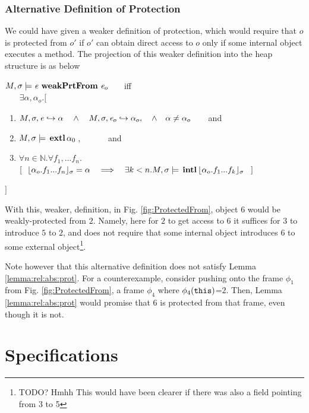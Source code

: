 \subsubsection{Alternative Definition of Protection}

We could have given a weaker definition of protection, which would require that $o$ is protected from $o'$ if $o'$ can obtain direct access to $o$ only if some internal object executes a method. 
The projection of this weaker definition into the heap structure is as below


$\satisfiesA{M}{\sigma}{ {\re\ }\textbf{weakPrtFrom}\ {\re_o} }$  \ \ \ iff \\
$\strut \ \ \ \ $  $\exists \alpha, \alpha_{o}. [\ $
\begin{enumerate}
\item $\eval{M}{\sigma}{{\re}}{\alpha} \ \ \ \wedge\ \ \  \eval{M}{\sigma}{{\re_{o}}}{\alpha_{o}},  \ \ \ \wedge\ \ \  \alpha \neq \alpha_{o}$\ \ \ \  and  
\item $M , \sigma \models {\ensuremath{\, \mathbf{extl}}\, \alpha_0\, }$, \ \ \ \ \ \ and  
\item 
$\forall n\in\mathbb{N}. \forall f_1,...f_n.$\\
$
[\ \ \interpret{\sigma}{\alpha_{o}.f_1...f_n}=\alpha \ \ \  \Longrightarrow \ \ \ \exists k<n. \satisfiesA{M} {\sigma} {\internal{{\interpret{\sigma}{\alpha_{o}.f_1...f_{k}}}}}\ \ ]$
\end{enumerate}
\strut \hspace{.4cm} $]$

With this, weaker, definition, in Fig. \ref{fig:ProtectedFrom}, object $6$ would be weakly-protected from $2$. Namely,  here 
for $2$  to get access to $6$ it suffices for $3$ to introduce $5$ to $2$, and does not require that some internal object introduces $6$ to some external object\footnote{TODO? Hmhh This would have been clearer if there was also a field pointing from 3 to 5}.

Note however that this alternative definition does not satisfy Lemma \ref{lemma:rel:abs:prot}. For a counterexample,   consider pushing onto the frame $\phi_1$ from Fig. \ref{fig:ProtectedFrom}, a frame $\phi_4$ where $\phi_4({\texttt{this}})$=$2$. Then, Lemma
\ref{lemma:rel:abs:prot} would promise that $6$ is protected from that frame, even though it is not.

\section{Specifications}

